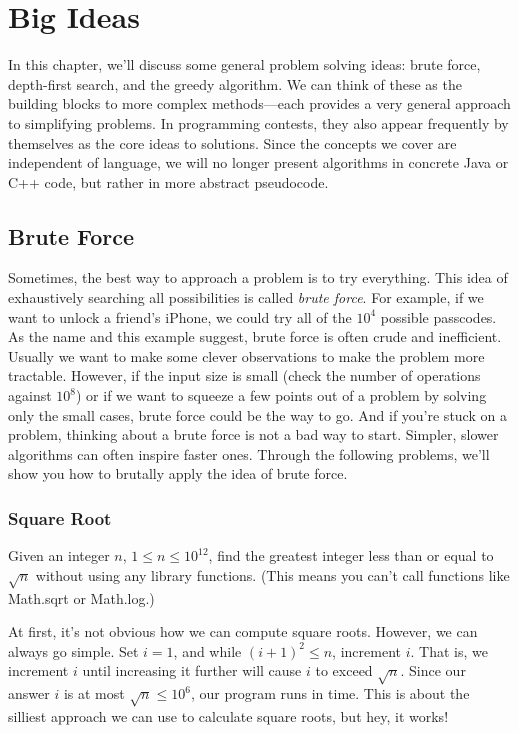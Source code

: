 \chapter{Big Ideas}

In this chapter, we'll discuss some general problem solving ideas: brute force, depth-first search, and the greedy algorithm. We can think of these as the building blocks to more complex methods---each provides a very general approach to simplifying problems. In programming contests, they also appear frequently by themselves as the core ideas to solutions. Since the concepts we cover are independent of language, we will no longer present algorithms in concrete Java or C++ code, but rather in more abstract pseudocode.

\section{Brute Force}

Sometimes, the best way to approach a problem is to try everything. This idea of exhaustively searching all possibilities is called \emph{brute force}. For example, if we want to unlock a friend's iPhone, we could try all of the $10^4$ possible passcodes. As the name and this example suggest, brute force is often crude and inefficient. Usually we want to make some clever observations to make the problem more tractable. However, if the input size is small (check the number of operations against $10^8$) or if we want to squeeze a few points out of a problem by solving only the small cases, brute force could be the way to go. And if you're stuck on a problem, thinking about a brute force is not a bad way to start. Simpler, slower algorithms can often inspire faster ones. Through the following problems, we'll show you how to brutally apply the idea of brute force.

\subsection{Square Root}

\begin{typewriter}
  Given an integer $n$, $1 \le n \le 10^{12}$, find the greatest integer less than or equal to $\sqrt{n}$ without using any library functions. (This means you can't call functions like Math.sqrt or Math.log.)
\end{typewriter}

At first, it's not obvious how we can compute square roots. However, we can always go simple. Set $i = 1$, and while $(i+1)^2\le n$, increment $i$. That is, we increment $i$ until increasing it further will cause $i$ to exceed $\sqrt n$. Since our answer $i$ is at most $\sqrt n \le 10^6$, our program runs in time. This is about the silliest approach we can use to calculate square roots, but hey, it works!

